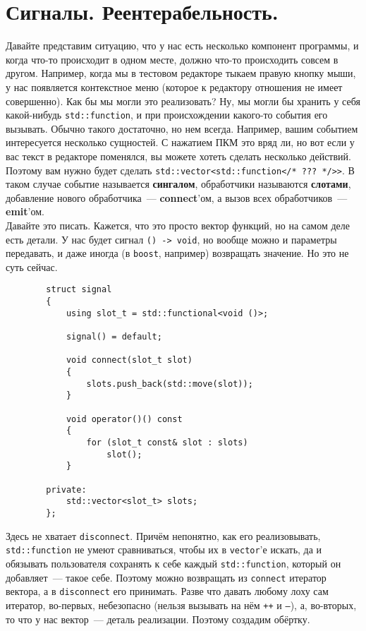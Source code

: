 \documentclass{article}
\begin{document}
    \section{Сигналы. Реентерабельность.}
    Давайте представим ситуацию, что у нас есть несколько компонент программы, и когда что-то происходит в одном месте, должно что-то происходить совсем в другом. Например, когда мы в тестовом редакторе тыкаем правую кнопку мыши, у нас появляется контекстное меню (которое к редактору отношения не имеет совершенно). Как бы мы могли это реализовать? Ну, мы могли бы хранить у себя какой-нибудь \texttt{std::function}, и при происхождении какого-то события его вызывать. Обычно такого достаточно, но нем всегда. Например, вашим событием интересуется несколько сущностей. С нажатием ПКМ это вряд ли, но вот если у вас текст в редакторе поменялся, вы можете хотеть сделать несколько действий. Поэтому вам нужно будет сделать \texttt{std::vector<std::function</* ??? */>>}. В таком случае событие называется \textbf{сингалом}, обработчики называются \textbf{слотами}, добавление нового обработчика~--- \textbf{connect}'ом, а вызов всех обработчиков~--- \textbf{emit}'ом.\\
    Давайте это писать. Кажется, что это просто вектор функций, но на самом деле есть детали. У нас будет сигнал \texttt{() -> void}, но вообще можно и параметры передавать, и даже иногда (в \texttt{boost}, например) возвращать значение. Но это не суть сейчас.
    \begin{verbatim}
        struct signal
        {
            using slot_t = std::functional<void ()>;

            signal() = default;

            void connect(slot_t slot)
            {
                slots.push_back(std::move(slot));
            }

            void operator()() const
            {
                for (slot_t const& slot : slots)
                    slot();
            }

        private:
            std::vector<slot_t> slots;
        };
    \end{verbatim}
    Здесь не хватает \texttt{disconnect}. Причём непонятно, как его реализовывать, \texttt{std::function} не умеют сравниваться, чтобы их в \texttt{vector}'е искать, да и обязывать пользователя сохранять к себе каждый \texttt{std::function}, который он добавляет~--- такое себе. Поэтому можно возвращать из \texttt{connect} итератор вектора, а в \texttt{disconnect} его принимать. Разве что давать любому лоху сам итератор, во-первых, небезопасно (нельзя вызывать на нём \texttt{++} и \texttt{--}), а, во-вторых, то что у нас вектор~--- деталь реализации. Поэтому создадим обёртку.
\end{document}
